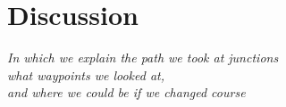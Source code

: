 \chapter{Discussion}

\begin{flushright}{\slshape
    In which we explain the path we took at junctions\\
    what waypoints we looked at,\\
    and where we could be if we changed course
}
\end{flushright}
